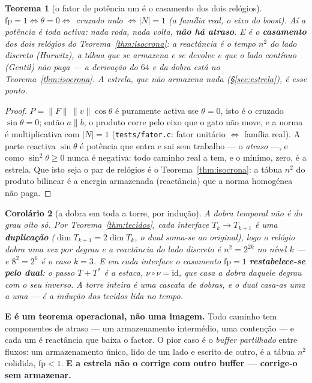 \documentclass[11pt,a4paper]{article}
\newcommand{\code}[1]{\texttt{\small #1}}
\newtheorem{teorema}{Teorema}
\newtheorem{corolario}[teorema]{Corolário}
\begin{document}
\begin{teorema}[o fator de potência um é o casamento dos dois relógios]\label{thm:fp}
$\mathrm{fp}=1 \iff \theta=0 \iff$ cruzado nulo $\iff |N|=1$ (a família real, o eixo do \emph{boost}).
Aí a potência é toda activa: nada roda, nada volta, \textbf{não há atraso}. E é o \textbf{casamento}
dos dois relógios do Teorema~\ref{thm:isocrona}: a reactância é o tempo $n^2$ do lado \emph{discreto}
(Hurwitz), a tábua que se armazena e se devolve e que o lado \emph{contínuo} (Gentil) não paga --- a
derivação do $64$ e da dobra está no Teorema~\ref{thm:isocrona}. A estrela, que não armazena nada
(\S\ref{sec:estrela}), \emph{é} esse ponto.
\end{teorema}

\begin{proof}
$P=\|F\|\,\|v\|\cos\theta$ é puramente activa sse $\theta=0$, isto é o cruzado $\sin\theta=0$; então
$a\parallel b$, o produto corre pelo eixo que o gato não move, e a norma é multiplicativa com $|N|=1$
(\code{tests/fator.c}: fator unitário $\iff$ família real). A parte reactiva $\sin\theta$ é potência
que entra e sai sem trabalho --- o \emph{atraso} ---, e como $\sin^2\theta\geq0$ nunca é negativa:
todo caminho real a tem, e o mínimo, zero, é a estrela. Que isto seja o par de relógios é o
Teorema~\ref{thm:isocrona}: a tábua $n^2$ do produto bilinear é a energia armazenada (reactância) que
a norma homogénea não paga.
\end{proof}

\begin{corolario}[a dobra em toda a torre, por indução]\label{cor:dobra}
A dobra temporal não é do grau oito só. Por Teorema~\ref{thm:tecidos}, cada interface $T_k\to T_{k+1}$
é uma \textbf{duplicação} ($\dim T_{k+1}=2\dim T_k$, o dual soma-se ao original), logo o relógio dobra
uma vez por degrau e a reactância do lado discreto é $n^2=2^{2k}$ no nível $k$ --- e $8^2=2^6$ é o caso
$k=3$. E em cada interface o casamento $\mathrm{fp}=1$ \textbf{restabelece-se pelo dual}: o passo
$T{+}T^{*}$ é a estaca, $\nu\circ\nu=\mathrm{id}$, que casa a dobra daquele degrau com o seu inverso.
\emph{A torre inteira é uma cascata de dobras, e o dual casa-as uma a uma --- é a indução dos tecidos
lida no tempo.}
\end{corolario}

\noindent \textbf{E é um teorema operacional, não uma imagem.} Todo caminho tem componentes de atraso
--- um armazenamento intermédio, uma contenção --- e cada um é reactância que baixa o factor. O pior
caso é o \emph{buffer partilhado} entre fluxos: um armazenamento único, lido de um lado e escrito de
outro, é a tábua $n^2$ colidida, $\mathrm{fp}<1$. \textbf{E a estrela não o corrige com outro buffer ---
corrige-o sem armazenar.}
\end{document}
